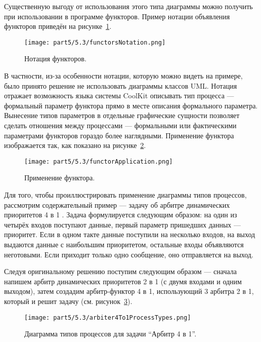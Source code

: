 Существенную выгоду от использования этого типа диаграммы можно получить при использовании 
в программе функторов. Пример нотации объявления функторов приведён на рисунке~\ref{image:functorsNotation}. 

\begin{figure} [ht]
	\begin{center}
		\texttt{[image: part5/5.3/functorsNotation.png]}
		\caption{Нотация функторов.}
		\label{image:functorsNotation}
	\end{center}
\end{figure}

В частности, из-за особенности нотации, которую можно видеть на примере, было принято 
решение не использовать диаграммы классов UML. Нотация отражает возможность языка 
системы CoolKit описывать тип процесса --- формальный параметр функтора прямо в месте 
описания формального параметра. Вынесение типов параметров в отдельные графические 
сущности позволяет сделать отношения между процессами --- формальными или фактическими 
параметрами функторов гораздо более наглядными. Применение функтора изображается так, 
как показано на рисунке~\ref{image:functorApplication}.

\begin{figure} [ht]
	\begin{center}
		\texttt{[image: part5/5.3/functorApplication.png]}
		\caption{Применение функтора.}
		\label{image:functorApplication}
	\end{center}
\end{figure}

Для того, чтобы проиллюстрировать применение диаграммы типов процессов, рассмотрим 
содержательный пример --- задачу об арбитре динамических приоритетов 4 в 1
. Задача формулируется следующим образом: на один из четырёх входов поступают данные, 
первый параметр пришедших данных --- приоритет. Если в одном такте данные поступили 
на несколько входов, на выход выдаются данные с наибольшим приоритетом, остальные 
входы объявляются неготовыми. Если приходит только одно сообщение, оно отправляется 
на выход.

Следуя оригинальному решению поступим следующим образом --- сначала напишем арбитр 
динамических приоритетов 2 в 1 (с двумя входами и одним выходом), затем создадим арбитр-функтор 
4 в 1, использующий 3 арбитра 2 в 1, который и решит задачу (см. рисунок~\ref{image:arbiter4To1ProcessTypes}). 

\begin{figure} [ht]
	\begin{center}
		\texttt{[image: part5/5.3/arbiter4To1ProcessTypes.png]}
		\caption{Диаграмма типов процессов для задачи "`Арбитр 4 в 1"'.}
		\label{image:arbiter4To1ProcessTypes}
	\end{center}
\end{figure}

